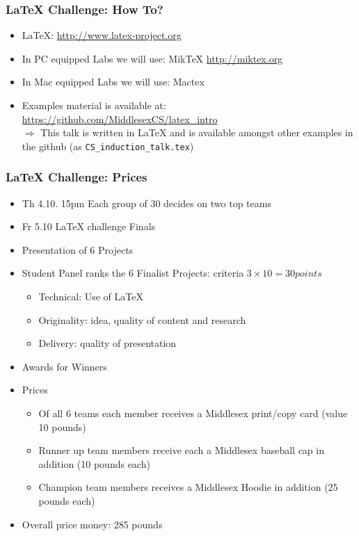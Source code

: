 \documentclass{beamer}
\begin{document}
\begin{frame}
\frametitle{LaTeX Challenge: How To?}
\begin{itemize}
\item LaTeX: \url{http://www.latex-project.org}
\item In PC equipped Labs we will use: MikTeX \url{http://miktex.org}
\item In Mac equipped Labs we will use: Mactex 
\item Examples material is available at: 
\url{https://github.com/MiddlesexCS/latex_intro} \\
\alert{$\Rightarrow$} This talk is written in LaTeX
  and is available amongst other examples in the github (as \texttt{CS\_induction\_talk.tex})
\end{itemize}
\end{frame}

\begin{frame}
\frametitle{LaTeX Challenge: Prices}
\begin{itemize}
\item \alert{Th 4.10. 15pm} Each group of 30 decides on two top teams
\item \alert{Fr 5.10} LaTeX challenge Finals
\item Presentation of 6 Projects
\item Student Panel ranks the 6 Finalist Projects: criteria \alert{$3\times 10 = 30 points$}
\begin{itemize}
\item Technical: Use of LaTeX
\item Originality: idea, quality of content and research
\item Delivery: quality of presentation
\end{itemize}
\item Awards for Winners
\item \alert{Prices}
\begin{itemize}
\item<1-3> Of all 6 teams each member receives a Middlesex print/copy card (value 10 pounds)
\item<2-3> Runner up team members receive each a Middlesex baseball cap in addition (10 pounds each)
\item<3> Champion team members receives a Middlesex Hoodie in addition (25 pounds each)
\end{itemize}
\item<3> Overall price money: 285 pounds
\end{itemize}
\end{frame}
\end{document}
